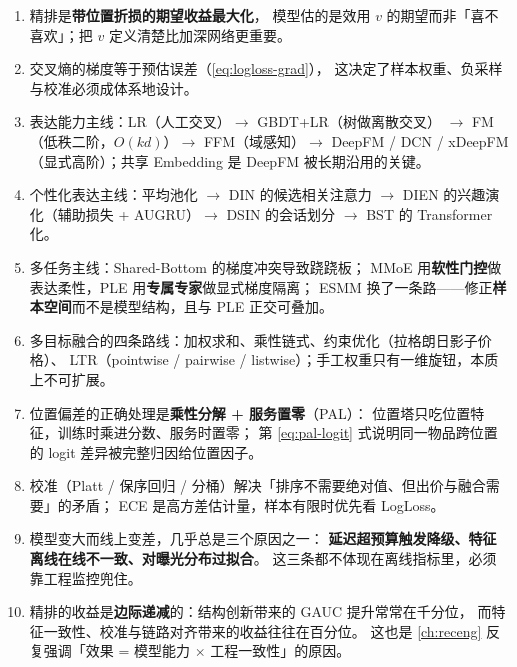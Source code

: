 \begin{keypoint}[本章要点回顾]
\begin{enumerate}
  \item 精排是\textbf{带位置折损的期望收益最大化}，
        模型估的是效用 $v$ 的期望而非「喜不喜欢」；把 $v$ 定义清楚比加深网络更重要。
  \item 交叉熵的梯度等于预估误差（\cref{eq:logloss-grad}），
        这决定了样本权重、负采样与校准必须成体系地设计。
  \item 表达能力主线：LR（人工交叉）$\to$ GBDT+LR（树做离散交叉）
        $\to$ FM（低秩二阶，$O(kd)$）$\to$ FFM（域感知）$\to$
        DeepFM / DCN / xDeepFM（显式高阶）；共享 Embedding 是 DeepFM 被长期沿用的关键。
  \item 个性化表达主线：平均池化 $\to$ DIN 的候选相关注意力
        $\to$ DIEN 的兴趣演化（辅助损失 + AUGRU）$\to$ DSIN 的会话划分 $\to$ BST 的 Transformer 化。
  \item 多任务主线：Shared-Bottom 的梯度冲突导致跷跷板；
        MMoE 用\textbf{软性门控}做表达柔性，PLE 用\textbf{专属专家}做显式梯度隔离；
        ESMM 换了一条路——修正\textbf{样本空间}而不是模型结构，且与 PLE 正交可叠加。
  \item 多目标融合的四条路线：加权求和、乘性链式、约束优化（拉格朗日影子价格）、
        LTR（pointwise / pairwise / listwise）；手工权重只有一维旋钮，本质上不可扩展。
  \item 位置偏差的正确处理是\textbf{乘性分解 + 服务置零}（PAL）：
        位置塔只吃位置特征，训练时乘进分数、服务时置零；
        第 \cref{eq:pal-logit} 式说明同一物品跨位置的 logit 差异被完整归因给位置因子。
  \item 校准（Platt / 保序回归 / 分桶）解决「排序不需要绝对值、但出价与融合需要」的矛盾；
        ECE 是高方差估计量，样本有限时优先看 LogLoss。
  \item 模型变大而线上变差，几乎总是三个原因之一：
        \textbf{延迟超预算触发降级、特征离线在线不一致、对曝光分布过拟合}。
        这三条都不体现在离线指标里，必须靠工程监控兜住。
  \item 精排的收益是\textbf{边际递减}的：结构创新带来的 GAUC 提升常常在千分位，
        而特征一致性、校准与链路对齐带来的收益往往在百分位。
        这也是 \cref{ch:receng} 反复强调「效果 = 模型能力 $\times$ 工程一致性」的原因。
\end{enumerate}
\end{keypoint}


